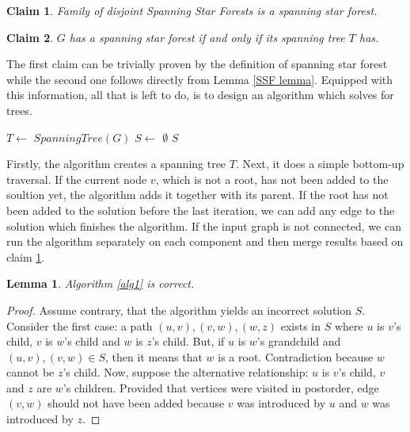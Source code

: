 \documentclass[en]{pracamgr}
\newtheorem{lemma}{Lemma}
\newtheorem{claim}{Claim}
\newcommand{\ssf}{spanning star forest}
\begin{document}
\begin{claim} \label{SSF sum}
	Family of disjoint {\normalfont Spanning Star Forests} is a \ssf{}.
\end{claim}

\begin{claim} \label{Spanning tree SSF}
	$G$ has a \ssf{} if and only if its spanning tree $T$ has.
\end{claim}

The first claim can be trivially proven by the definition of \ssf{} while the second one follows directly from Lemma \ref{SSF lemma}. Equipped with this information, all that is left to do, is to design an algorithm which solves for trees.

\begin{algorithm}\label{alg1}
	\KwResult{\ssf{} of $G$}
	$T \leftarrow$ $SpanningTree(G)$\;
	$S \leftarrow$ $\emptyset$\;
	\Return $S$
	\caption{Obtaining a Spanning Star Forest from a tree.}
\end{algorithm}

Firstly, the algorithm creates a spanning tree $T$. Next, it does a simple bottom-up traversal. If the current node $v$, which is not a root, has not been added to the soultion yet, the algorithm adds it together with its parent. If the root has not been added to the solution before the last iteration, we can add any edge to the solution which finishes the algorithm. If the input graph is not connected, we can run the algorithm separately on each component and then merge results based on claim \ref{SSF sum}.

\begin{lemma}\label{alg1 correctness}
	Algorithm \ref{alg1} is correct.
\end{lemma}

\begin{proof}
	Assume contrary, that the algorithm yields an incorrect solution $S$. Consider
	the first case: a path $(u,v),(v,w),(w,z)$ exists in $S$ where $u$ is $v$'s 
	child, $v$ is $w$'s child and $w$ is $z$'s child. But, if $u$ is $w$'s
	grandchild and $(u,v),(v,w) \in S$, then it means that $w$ is a root. 
	Contradiction because $w$ cannot be $z$'s child.
	Now, suppose the alternative relationship: $u$ is $v$'s child, $v$ and $z$ are
	$w$'s children. Provided that vertices were visited in postorder, edge $(v,w)$
	should not have been added because $v$ was introduced by $u$ and $w$ was
	introduced by $z$.
\end{proof}
\end{document}
